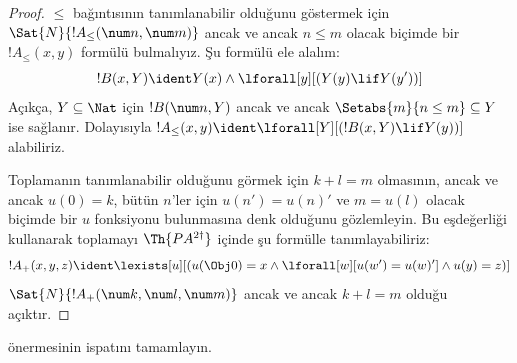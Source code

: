 \begin{proof}
$\le$ bağıntısının tanımlanabilir olduğunu göstermek için
$\Sat{N}{!A_\le(\num n, \num m)}$ ancak ve ancak $n\le m$ olacak biçimde bir
$!A_\le(x,y)$ formülü bulmalıyız. Şu formülü ele alalım:
\[
!B(x, Y) \ident Y(x) \land \lforall[y][(Y(y) \lif Y(y'))]
\]
Açıkça, $Y\subseteq\Nat$ için $!B(\num n,Y)$ ancak ve ancak
$\Setabs{m}{n\le m}\subseteq Y$ ise sağlanır. Dolayısıyla
$!A_\le(x,y)\ident\lforall[Y][(!B(x,Y)\lif Y(y))]$ alabiliriz.

Toplamanın tanımlanabilir olduğunu görmek için $k+l=m$ olmasının, ancak ve
ancak $u(0)=k$, bütün $n$'ler için $u(n')=u(n)'$ ve $m=u(l)$ olacak biçimde
bir $u$ fonksiyonu bulunmasına denk olduğunu gözlemleyin. Bu eşdeğerliği
kullanarak toplamayı $\Th{PA^{2\dagger}}$ içinde şu formülle tanımlayabiliriz:
\[
!A_+(x,y,z) \ident \lexists[u][(u(\Obj 0)=x \land \lforall[w][u(w')=u
 (w)'] \land u(y)=z)]
\]
$\Sat{N}{!A_+(\num k,\num l,\num m)}$ ancak ve ancak $k+l=m$ olduğu açıktır.
\end{proof}

\begin{prob}
 önermesinin ispatını tamamlayın.
\end{prob}

